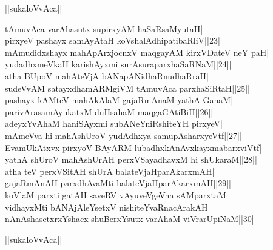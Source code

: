 \documentclass{article}
\begin{document}
\begin{center}
||sukaloVvAca||
\end{center}

tAmuvAca varAhasutx supirxyAM haSaRsaMyutaH|\\
pirxyeV pashayx samAyAtaH koVshalAdhipatibaRliV||23||\\
mAmudidxshayx mahApArxjocnxV maqgayAM kirxVDateV neY paH|\\
yudadhxmeVkaH karishAyxmi surAsuraparxhaSaRNaM||24||\\
atha BUpoV mahAteVjA bANapANidhaRnudhaRraH|\\
sudeVvAM satayxdhamARMgiVM tAmuvAca parxhaSiRtaH||25||\\
pashayx kAMteV mahAkAlaM gajaRmAnaM yathA GanaM|\\
parivArasamAyukatxM duHsahaM maqgaGAtiBiH||26||\\
adeyxYvAhaM haniSAyxmi subANeYniRshiteYH pirxyeV|\\
mAmeVva hi mahAshUroV yudAdhxya samupAsharxyeVtf||27||\\
EvamUkAtxvx pirxyoV BAyARM lubadhxkAnAvxkayxmabarxviVtf|\\
yathA shUroV mahAshUrAH perxVSayadhavxM hi shUkaraM||28||\\
atha teV perxVSitAH shUrA balateVjaHparAkarxmAH|\\
gajaRmAnAH parxdhAvaMti balateVjaHparAkarxmAH||29||\\
koVlaM parxti gatAH saveRV vAyuveVgeVna sAMparxtaM|\\
vidhayxMti bANAjAleYsetxV nishiteYvaRnacArakAH|\\
nAnAshasetxrxYshacx shuBerxYsutx varAhaM viVrarUpiNaM||30||\\

\begin{center}
||sukaloVvAca||
\end{center}
\end{document}
